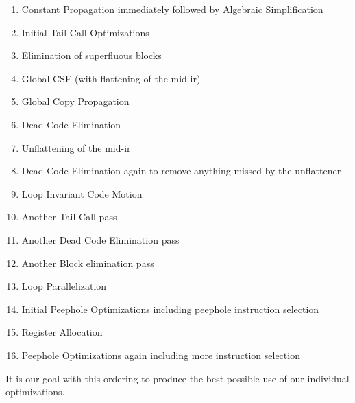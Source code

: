 \documentclass[11pt]{article}
\begin{document}
\begin{enumerate}

\item Constant Propagation immediately followed by Algebraic
  Simplification 

\item Initial Tail Call Optimizations 

\item Elimination of superfluous blocks 

\item Global CSE (with flattening of the mid-ir)

\item Global Copy Propagation

\item Dead Code Elimination

\item Unflattening of the mid-ir 

\item Dead Code Elimination again to remove anything missed by the
  unflattener 

\item Loop Invariant Code Motion

\item Another Tail Call pass 

\item Another Dead Code Elimination pass 

\item Another Block elimination pass 

\item Loop Parallelization

\item Initial Peephole Optimizations including peephole instruction selection

\item Register Allocation

\item Peephole Optimizations again including more instruction selection

\end{enumerate}

\noindent It is our goal with this ordering to produce the best possible use of
our individual optimizations. 
\end{document}
